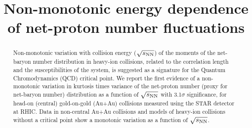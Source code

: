 \documentclass[10pt,aps,prc,twocolumn,floatfix]{revtex4-1}
\newcommand{\rootsnn} {\mbox{$\sqrt{s_{\rm NN}}$}\xspace}
\begin{document}
\title{Non-monotonic energy dependence of net-proton number fluctuations}







\begin{abstract}
Non-monotonic variation with collision energy (\rootsnn) of the moments of the net-baryon number distribution in heavy-ion 
collisions, related to the correlation length and the susceptibilities of the system, is 
suggested as a signature for the Quantum Chromodynamics (QCD) critical point. We report the first evidence of a non-monotonic variation in
kurtosis times variance of the net-proton number (proxy for net-baryon
number) distribution as a function of  \rootsnn
with 3.1$\sigma$ significance, for head-on (central) gold-on-gold
(Au+Au) collisions measured  using the STAR
detector
at RHIC.  Data in non-central Au+Au
collisions and models of heavy-ion collisions without a critical point show a monotonic
variation as a function of \rootsnn. 
\end{abstract}
\maketitle
%
\end{document}
